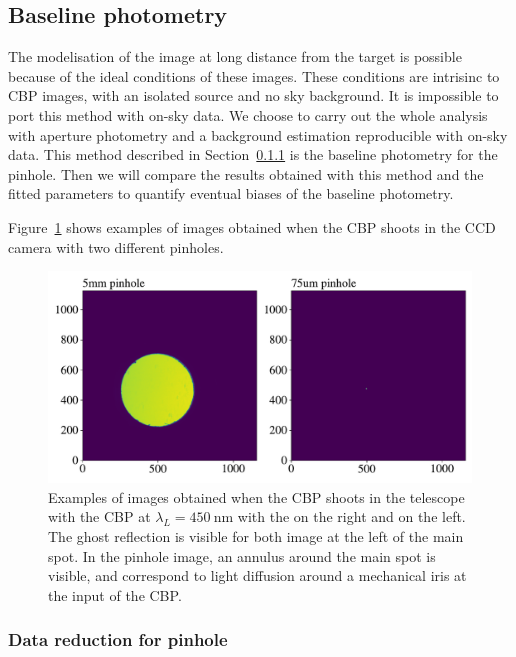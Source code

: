 \subsection{Baseline photometry}

The modelisation of the image at long distance from the target is possible because of the ideal conditions of these images. These conditions are intrisinc to CBP images, with an isolated source and no sky background. It is impossible to port this method with on-sky data. We choose to carry out the whole analysis with aperture photometry and a background estimation reproducible with on-sky data. This method described in Section~\ref{sec:photometry_small} is the baseline photometry for the \spinhole pinhole. Then we will compare the results obtained with this method and the fitted parameters to quantify eventual biases of the baseline photometry.

Figure~\ref{fig:ccd_examples} shows examples of images obtained when the CBP shoots in the \SD CCD camera with two different pinholes. 

\begin{figure}[h]
    \centering
    \includegraphics[width=\columnwidth]{fig/ccd_examples.pdf}
    \caption{Examples of images obtained when the CBP shoots in the \SD telescope with the CBP at $\lambda_L=\SI{450}{\nm}$ with the \bpinhole on the right and \spinhole on the left. The ghost reflection is visible for both image at the left of the main spot. In the \bpinhole pinhole image, an annulus around the main spot is visible, and correspond to light diffusion around a mechanical iris at the input of the CBP.}
    \label{fig:ccd_examples}
\end{figure}

\subsubsection{Data reduction for \spinhole pinhole}
\label{sec:photometry_small}

